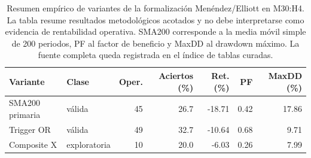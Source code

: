 \begin{table}[H]
\centering
\scriptsize
\begin{tabular}{llrrrrr}
\hline
Variante & Clase & Oper. & Aciertos (\%) & Ret. (\%) & PF & MaxDD (\%) \\
\hline
SMA200 primaria & v\'alida & 45 & 26.7 & -18.71 & 0.42 & 17.86 \\
Trigger OR & v\'alida & 49 & 32.7 & -10.64 & 0.68 & 9.71 \\
Composite X & exploratoria & 10 & 20.0 & -6.03 & 0.26 & 7.99 \\
\hline
\end{tabular}
\caption[Variantes de la formalizaci\'on Men\'endez/Elliott]{Resumen emp\'irico de variantes de la formalizaci\'on Men\'endez/Elliott en M30:H4. La tabla resume resultados metodol\'ogicos acotados y no debe interpretarse como evidencia de rentabilidad operativa. SMA200 corresponde a la media m\'ovil simple de 200 periodos, PF al factor de beneficio y MaxDD al drawdown m\'aximo. La fuente completa queda registrada en el \'indice de tablas curadas.}
\label{tab:menendez-variantes}
\end{table}
